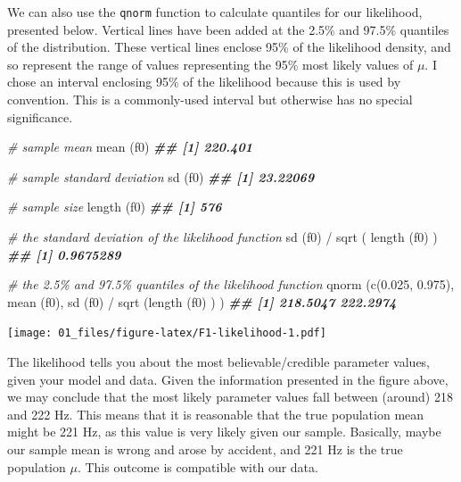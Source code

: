 \documentclass[
]{book}
\newenvironment{Shaded}{\begin{snugshade}}{\end{snugshade}}
\newcommand{\CommentTok}[1]{\textcolor[rgb]{0.56,0.35,0.01}{\textit{#1}}}
\newcommand{\DocumentationTok}[1]{\textcolor[rgb]{0.56,0.35,0.01}{\textbf{\textit{#1}}}}
\newcommand{\FloatTok}[1]{\textcolor[rgb]{0.00,0.00,0.81}{#1}}
\newcommand{\FunctionTok}[1]{\textcolor[rgb]{0.00,0.00,0.00}{#1}}
\newcommand{\NormalTok}[1]{#1}
\newcommand{\SpecialCharTok}[1]{\textcolor[rgb]{0.00,0.00,0.00}{#1}}
\begin{document}
We can also use the \texttt{qnorm} function to calculate quantiles for our likelihood, presented below. Vertical lines have been added at the 2.5\% and 97.5\% quantiles of the distribution. These vertical lines enclose 95\% of the likelihood density, and so represent the range of values representing the 95\% most likely values of \(\mu\). I chose an interval enclosing 95\% of the likelihood because this is used by convention. This is a commonly-used interval but otherwise has no special significance.

\begin{Shaded}
\begin{Highlighting}[]
\CommentTok{\# sample mean}
\FunctionTok{mean}\NormalTok{ (f0)   }
\DocumentationTok{\#\# [1] 220.401}

\CommentTok{\# sample standard deviation}
\FunctionTok{sd}\NormalTok{ (f0)     }
\DocumentationTok{\#\# [1] 23.22069}

\CommentTok{\# sample size}
\FunctionTok{length}\NormalTok{ (f0)  }
\DocumentationTok{\#\# [1] 576}

\CommentTok{\# the standard deviation of the likelihood function}
\FunctionTok{sd}\NormalTok{ (f0) }\SpecialCharTok{/} \FunctionTok{sqrt}\NormalTok{ ( }\FunctionTok{length}\NormalTok{ (f0) ) }
\DocumentationTok{\#\# [1] 0.9675289}

\CommentTok{\# the 2.5\% and 97.5\% quantiles of the likelihood function}
\FunctionTok{qnorm}\NormalTok{ (}\FunctionTok{c}\NormalTok{(}\FloatTok{0.025}\NormalTok{, }\FloatTok{0.975}\NormalTok{), }\FunctionTok{mean}\NormalTok{ (f0), }\FunctionTok{sd}\NormalTok{ (f0) }\SpecialCharTok{/} \FunctionTok{sqrt}\NormalTok{ (}\FunctionTok{length}\NormalTok{ (f0) ) )}
\DocumentationTok{\#\# [1] 218.5047 222.2974}
\end{Highlighting}
\end{Shaded}

\texttt{[image: 01\_files/figure-latex/F1-likelihood-1.pdf]}
~

The likelihood tells you about the most believable/credible parameter values, given your model and data. Given the information presented in the figure above, we may conclude that the most likely parameter values fall between (around) 218 and 222 Hz. This means that it is reasonable that the true population mean might be 221 Hz, as this value is very likely given our sample. Basically, maybe our sample mean is wrong and arose by accident, and 221 Hz is the true population \(\mu\). This outcome is compatible with our data.
\end{document}
